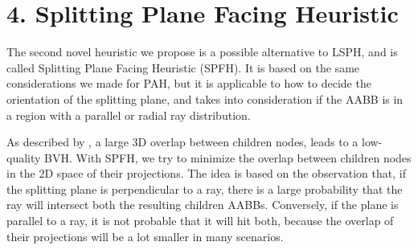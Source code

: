 \documentclass[11pt,a4paper,twocolumn]{article}
\begin{document}
\section*{4. Splitting Plane Facing Heuristic}
The second novel heuristic we propose is a possible alternative to LSPH, and is called Splitting Plane Facing Heuristic (SPFH). It is based on the same considerations we made for PAH, but it is applicable to how to decide the orientation of the splitting plane, and takes into consideration if the AABB is in a region with a parallel or radial ray distribution.

As described by \cite{bvh_overlapping_metric}, a large 3D overlap between children nodes, leads to a low-quality BVH. With SPFH, we try to minimize the overlap between children nodes in the 2D space of their projections. The idea is based on the observation that, if the splitting plane is perpendicular to a ray, there is a large probability that the ray will intersect both the resulting children AABBs. Conversely, if the plane is parallel to a ray, it is not probable that it will hit both, because the overlap of their projections will be a lot smaller in many scenarios.
\end{document}
